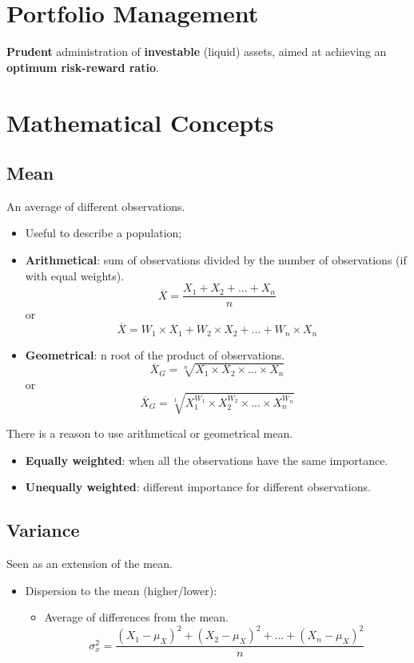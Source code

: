 \documentclass[11pt,a4paper]{report}
\begin{document}
\section{Portfolio Management}
\textbf{Prudent} administration of \textbf{investable} (liquid) assets, aimed at achieving an \textbf{optimum risk-reward ratio}.

\section{Mathematical Concepts}
\subsection{Mean} An average of different observations.
\begin{itemize}
    \item Useful to describe a population;
    \item \textbf{Arithmetical}: sum of observations divided by the number of observations (if with equal weights).
    \[\overline{X} = \frac{X_1 + X_2 + ... + X_n}{n}\]
    or
    \[\overline{X} = W_1 \times X_1 + W_2 \times X_2 + ... + W_n \times X_n\]
    \item \textbf{Geometrical}: n root of the product of observations.
    \[\overline{X}_G = \sqrt[n]{X_1 \times X_2 \times ... \times X_n}\]
    or
    \[\overline{X}_G = \sqrt[1]{X_1^{W_1} \times X_2^{W_2} \times ... \times X_n^{W_n}} \]
\end{itemize}
There is a reason to use arithmetical or geometrical mean.
\begin{itemize}
    \item \textbf{Equally weighted}: when all the observations have the same importance.
    \item \textbf{Unequally weighted}: different importance for different observations.
\end{itemize}

\subsection{Variance} Seen as an extension of the mean.
\begin{itemize}
    \item Dispersion to the mean (higher/lower):
    \begin{itemize}
        \item Average of differences from the mean.
        \[\sigma_x^2 = \frac{(X_1 - \mu_X)^2 + (X_2 - \mu_X)^2 + ... + (X_n - \mu_X)^2}{n}\]
    \end{itemize}
    
\end{itemize}
\end{document}
